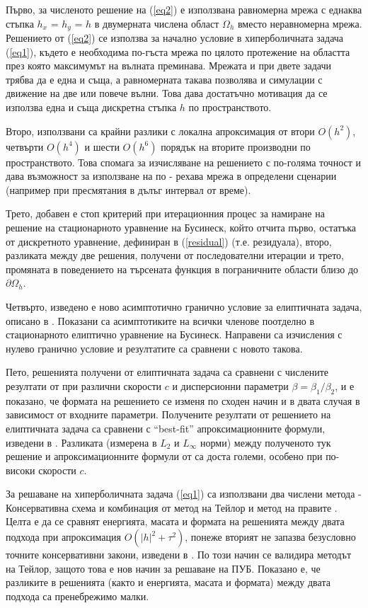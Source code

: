 \documentclass[a4paper]{article}
\newcommand{\rf}[1]{(\ref{#1})}
\theoremstyle{remark}
\begin{document}
\begin{large}
Първо, за численото решение на \rf{eq2} е използвана равномерна мрежа с еднаква стъпка $h_x$ = $h_y$ = $h$ в двумерната числена област $\Omega_h$ вместо неравномерна мрежа. Решението от \rf{eq2} се използва за начално условие в хиперболичната задача \rf{eq1}, където е необходима по-гъста мрежа по цялото протежение на областта през която максимумът на вълната преминава. Мрежата и при двете задачи трябва да е една и съща, а равномерната такава позволява и симулации с движение на две или повече вълни. Това дава достатъчно мотивация да се използва една и съща дискретна стъпка $h$ по пространството. 

Второ, използвани са крайни разлики с локална апроксимация от втори $O(h^2)$, четвърти $O(h^4)$ и шести $O(h^6)$ порядък на вторите производни по пространството. Това спомага за изчисляване на решението с по-голяма точност и дава възможност за използване на по - рехава мрежа в определени сценарии (например при пресмятания в дълъг интервал от време).

Трето, добавен е стоп критерий при итерационния процес за намиране на решение на стационарното уравнение на Бусинеск, който отчита първо, остатъка от дискретното уравнение, дефиниран в \rf{residual} (т.е. резидуала), второ, разликата между две решения, получени от последователни итерации и трето, промяната в поведението на търсената функция в пограничните области близо до $\partial \Omega_h$.

Четвърто, изведено е ново асимптотично гранично условие за елиптичната задача, описано в \cite{bnd}. Показани са асимптотиките на всички членове поотделно в стационарното елиптично уравнение на Бусинеск. Направени са изчисления с нулево гранично условие и резултатите са сравнени с новото такова.

Пето, решенията получени от елиптичната задача са сравнени с числените резултати от \cite{ref15,ref117,ref116} при различни скорости $c$ и дисперсионни параметри $\beta =\beta_1  / \beta_2$, и е показано, че формата на решението се изменя по сходен начин и в двата случая в зависимост от входните параметри. Получените резултати от решението на елиптичната задача са сравнени с ``best-fit'' апроксимационните формули, изведени в \cite{ref15}. Разликата (измерена в $L_2$ и $L_\infty$ норми) между полученото тук решение и  апроксимационните формули от \cite{ref15} са доста големи, особено при по-високи скорости $c$.

За решаване на хиперболичната задача \rf{eq1} са използвани два числени метода - Консервативна схема \cite{ref999, ref1000} и комбинация от метод на Тейлор и метод на правите \cite{refHyp}.
Целта е да се сравнят енергията, масата и формата на решенията между двата подхода при апроксимация $O(|h|^2 + \tau^2)$, понеже вторият не запазва безусловно точните консервативни закони, изведени в \cite{ref1,ref159}. По този начин се валидира методът на Тейлор, защото това е нов начин за решаване на ПУБ. Показано е, че разликите в решенията (както и енергията, масата и формата) между двата подхода са пренебрежимо малки. 


\end{large}
\end{document}
